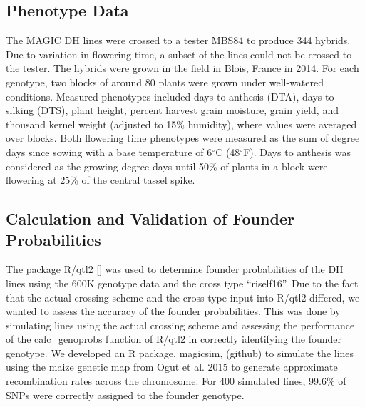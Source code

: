 \documentclass[article,9pt,twocolumn,twoside]{rilabRxiv}
\begin{document}
\subsection{Phenotype Data}
The MAGIC DH lines were crossed to a tester MBS84 to produce 344 hybrids.
 Due to variation in flowering time, a subset of the lines could not be crossed
  to the tester. The hybrids were grown in the field in Blois, France in 2014.
   For each genotype, two blocks of around 80 plants were grown under
   well-watered conditions. Measured phenotypes included days to anthesis (DTA),
    days to silking (DTS), plant height, percent harvest grain moisture, grain
     yield, and thousand kernel weight (adjusted to 15\% humidity), where values
      were averaged over blocks. Both flowering time phenotypes were measured as
       the sum of degree days since sowing with a base temperature of
        6$^{\circ}$C (48$^{\circ}$F). Days to anthesis was considered as the
         growing degree days until 50\% of plants in a block were flowering at
          25\% of the central tassel spike.

\subsection{Calculation and Validation of Founder Probabilities}
The package R/qtl2 [] was used to determine founder probabilities of the DH
 lines using the 600K genotype data and the cross type ``riself16''. Due to the
  fact that the actual crossing scheme and the cross type input into R/qtl2
   differed, we wanted to assess the accuracy of the founder probabilities.
    This was done by simulating lines using the actual crossing scheme and
     assessing the performance of the calc\_genoprobs function of R/qtl2 in
      correctly identifying the founder genotype. We developed an R package,
       magicsim, (github) to simulate the lines using the maize genetic map
        from Ogut et al. 2015 to generate approximate recombination rates across
         the chromosome. For 400 simulated lines, 99.6\% of SNPs were correctly
          assigned to the founder genotype.
\end{document}
